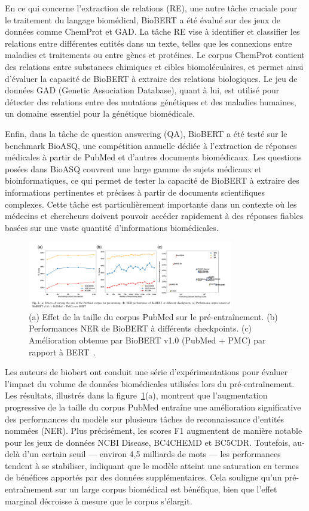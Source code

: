 \documentclass[12pt]{report}
\begin{document}
En ce qui concerne l’extraction de relations (RE), une autre tâche cruciale pour le traitement du langage biomédical, BioBERT a été évalué sur des jeux de données comme ChemProt et GAD. La tâche RE vise à identifier et classifier les relations entre différentes entités dans un texte, telles que les connexions entre maladies et traitements ou entre gènes et protéines. Le corpus ChemProt contient des relations entre substances chimiques et cibles biomoléculaires, et permet ainsi d’évaluer la capacité de BioBERT à extraire des relations biologiques. Le jeu de données GAD (Genetic Association Database), quant à lui, est utilisé pour détecter des relations entre des mutations génétiques et des maladies humaines, un domaine essentiel pour la génétique biomédicale.

Enfin, dans la tâche de question answering (QA), BioBERT a été testé sur le benchmark BioASQ, une compétition annuelle dédiée à l’extraction de réponses médicales à partir de PubMed et d'autres documents biomédicaux. Les questions posées dans BioASQ couvrent une large gamme de sujets médicaux et bioinformatiques, ce qui permet de tester la capacité de BioBERT à extraire des informations pertinentes et précises à partir de documents scientifiques complexes. Cette tâche est particulièrement importante dans un contexte où les médecins et chercheurs doivent pouvoir accéder rapidement à des réponses fiables basées sur une vaste quantité d’informations biomédicales.

\begin{figure}[H]
    \centering
    \includegraphics[width=0.8\textwidth]{result_biobert.png}
    \caption{(a) Effet de la taille du corpus PubMed sur le pré-entraînement. (b) Performances NER de BioBERT à différents checkpoints. (c) Amélioration obtenue par BioBERT v1.0 (PubMed + PMC) par rapport à BERT~\cite{lee2020biobert}.}
    \label{fig:biobert_results}
\end{figure}

Les auteurs de \gls{biobert} ont conduit une série d'expérimentations pour évaluer l'impact du volume de données biomédicales utilisées lors du pré-entraînement. Les résultats, illustrés dans la figure~\ref{fig:biobert_results}(a), montrent que l’augmentation progressive de la taille du corpus PubMed entraîne une amélioration significative des performances du modèle sur plusieurs tâches de reconnaissance d’entités nommées (NER). Plus précisément, les scores F1 augmentent de manière notable pour les jeux de données NCBI Disease, BC4CHEMD et BC5CDR. Toutefois, au-delà d’un certain seuil — environ 4,5 milliards de mots — les performances tendent à se stabiliser, indiquant que le modèle atteint une saturation en termes de bénéfices apportés par des données supplémentaires. Cela souligne qu’un pré-entraînement sur un large corpus biomédical est bénéfique, bien que l’effet marginal décroisse à mesure que le corpus s’élargit.
\end{document}
